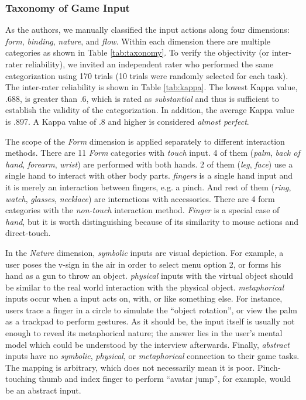 \documentclass{sigchi}
\begin{document}
  \subsubsection{Taxonomy of Game Input}
       
  As the authors, we manually classified the input actions along four dimensions: \emph{form}, \emph{binding}, \emph{nature}, and \emph{flow}. Within each dimension there are multiple categories as shown in Table \ref{tab:taxonomy}. To verify the objectivity (or inter-rater reliability), we invited an independent rater who performed the same categorization using 170 trials (10 trials were randomly selected for each task). The inter-rater reliability is shown in Table \ref{tab:kappa}. The lowest Kappa value, .688, is greater than .6, which is rated as \textsl{substantial} and thus is sufficient to establish the validity of the categorization. In addition, the average Kappa value is .897. A Kappa value of .8 and higher is considered \textsl{almost perfect}\cite{kappavalue}.



  

  The scope of the \emph{Form} dimension is applied separately to different interaction methods. There are 11 \emph{Form} categories with \emph{touch} input. 4 of them (\emph{palm}, \emph{back of hand}, \emph{forearm}, \emph{wrist}) are performed with both hands. 2 of them (\emph{leg}, \emph{face}) use a single hand to interact with other body parts. \emph{fingers} is a single hand input and it is merely an interaction between fingers, e.g. a pinch. And rest of them (\emph{ring}, \emph{watch}, \emph{glasses}, \emph{necklace}) are interactions with accessories. There are 4 form categories with the \emph{non-touch} interaction method. \emph{Finger} is a special case of \emph{hand}, but it is worth distinguishing because of its similarity to mouse actions and direct-touch.


  In the \emph{Nature} dimension, \emph{symbolic} inputs are visual depiction. For example, a user poses the v-sign in the air in order to select menu option 2, or forms his hand as a gun to throw an object. \emph{physical} inputs with the virtual object should be similar to the real world interaction with the physical object. \emph{metaphorical} inputs occur when a input acts on, with, or like something else. For instance, users trace a finger in a circle to simulate the ``object rotation'', or view the palm as a trackpad to perform gestures. As it should be, the input itself is usually not enough to reveal its metaphorical nature; the answer lies in the user's mental model which could be understood by the interview afterwards. Finally, \emph{abstract} inputs have no \emph{symbolic}, \emph{physical}, or \emph{metaphorical} connection to their game tasks. The mapping is arbitrary, which does not necessarily mean it is poor. Pinch-touching thumb and index finger to perform ``avatar jump'', for example, would be an abstract input.
\end{document}
